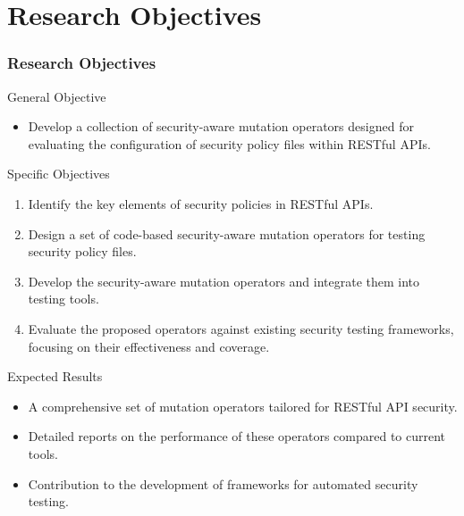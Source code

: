 \documentclass[12pt]{beamer}
\theoremstyle{remark}
\theoremstyle{definition}
\begin{document}
\section{Research Objectives}


\begin{frame}[allowframebreaks]
\frametitle{Research Objectives}
\begin{block}{General Objective}
\begin{itemize}
    \item Develop a collection of security-aware mutation operators designed for evaluating the configuration of security policy files within RESTful APIs.
\end{itemize}
\end{block}

\begin{block}{Specific Objectives}
\begin{enumerate}
    \item Identify the key elements of security policies in RESTful APIs.
    \item Design a set of code-based security-aware mutation operators for testing security policy files.
    \item Develop the security-aware mutation operators and integrate them into testing tools.
    \item Evaluate the proposed operators against existing security testing frameworks, focusing on their effectiveness and coverage.
\end{enumerate}
\end{block}

\begin{block}{Expected Results}
\begin{itemize}
    \item A comprehensive set of mutation operators tailored for RESTful API security.
    \item Detailed reports on the performance of these operators compared to current tools.
    \item Contribution to the development of frameworks for automated security testing.
\end{itemize}
\end{block}
\end{frame}
\end{document}
